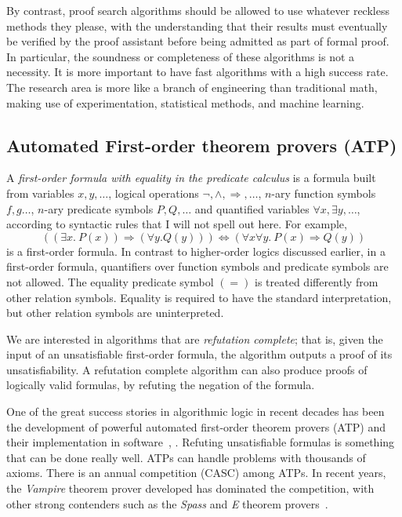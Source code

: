 \documentclass[brochure,english,12pt]{bourbaki}
\theoremstyle{plain}
\begin{document}
By contrast, proof search algorithms should be allowed to use whatever
reckless methods they please, with the understanding that their results must
eventually be verified by  the proof assistant before being admitted as part of
formal proof.  In particular, the soundness or completeness of these algorithms
is not a necessity.  It is more important to have fast algorithms with a high
success rate.  The research area is more like a branch of engineering than traditional
math, making use of 
experimentation, statistical methods, and machine learning.



\subsection{Automated First-order theorem provers (ATP)}



A {\it first-order formula with equality in the predicate calculus} is a formula built
from variables $x,y,\ldots$, logical operations $\neg, \land, \Rightarrow,\ldots$, $n$-ary function symbols $f,g\ldots$, 
 $n$-ary predicate symbols $P, Q,\ldots$  and quantified variables $\forall x, \exists y,\ldots$,
according to syntactic rules that I will not spell out here.     For example,
\[
((\exists x.~P(x)) \Rightarrow (\forall y. Q(y))) \Leftrightarrow (\forall x\forall y.~P(x)\Rightarrow Q(y))
\]
is a first-order formula.
In contrast to higher-order logics discussed earlier, in a first-order formula,
quantifiers over function symbols and predicate symbols are not allowed.
The equality predicate  symbol $(=)$ is treated differently from other relation symbols.  Equality is required to have the
standard interpretation, but other relation symbols are uninterpreted.

We are interested in algorithms that are {\it refutation complete}; that is, given
the input of an unsatisfiable first-order formula, the algorithm outputs 
a proof of its unsatisfiability.  A refutation complete
algorithm can also produce proofs of logically valid formulas, by refuting the negation of the formula.

One of the great success stories in algorithmic logic in recent decades has been the development of
powerful automated first-order theorem provers (ATP) 
and their implementation in software~\cite{bachmair2001resolution}, \cite{Ha09}.   
Refuting unsatisfiable formulas
 is something that can be done really well.  ATPs can handle problems with thousands of axioms.
There is an annual competition (CASC) among ATPs.  In recent years, the {\it Vampire} 
theorem prover developed has
dominated the competition, with other strong contenders such as the {\it Spass} and {\it E} theorem provers~\cite{riazanov2002design}.  
\end{document}
